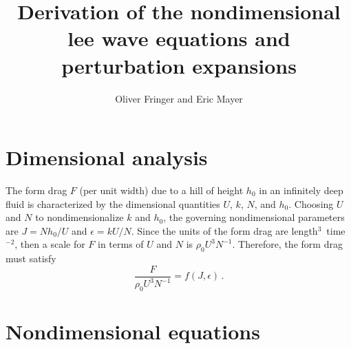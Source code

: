 \documentclass[12pt]{article}
\begin{document}
\title{Derivation of the nondimensional lee wave equations and perturbation expansions}

\author{Oliver Fringer and Eric Mayer}

\maketitle

\section{Dimensional analysis}

The form drag $F$ (per unit width) due to a hill of height $h_0$ in an infinitely 
deep fluid is characterized by the dimensional quantities
$U$, $k$, $N$, and $h_0$.  Choosing $U$ and $N$ to nondimensionalize $k$ and $h_0$, the governing
nondimensional parameters are $J = N h_0/U$ and $\epsilon = k U/N$.  Since the units of the form drag
are length$^3$~time$^{-2}$, then a scale for $F$ in terms of $U$ and $N$ is $\rho_0 U^3 N^{-1}$. Therefore,
the form drag must satisfy
\[
\frac{F}{\rho_0 U^3 N^{-1}} = f(J, \epsilon)\,.
\]

\section{Nondimensional equations} \label{eq:equations}
\end{document}
